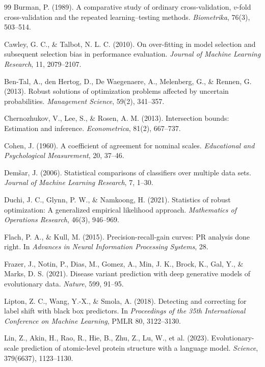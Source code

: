 \documentclass[11pt]{article}
\theoremstyle{remark}
\begin{document}
\begin{thebibliography}{99}
Burman, P. (1989).
A comparative study of ordinary cross-validation, $v$-fold cross-validation
and the repeated learning--testing methods.
\emph{Biometrika}, 76(3), 503--514.

Cawley, G. C., \& Talbot, N. L. C. (2010).
On over-fitting in model selection and subsequent selection bias in performance
evaluation.
\emph{Journal of Machine Learning Research}, 11, 2079--2107.

Ben-Tal, A., den Hertog, D., De Waegenaere, A., Melenberg, G., \& Rennen, G. (2013).
Robust solutions of optimization problems affected by uncertain probabilities.
\emph{Management Science}, 59(2), 341--357.

Chernozhukov, V., Lee, S., \& Rosen, A. M. (2013).
Intersection bounds: Estimation and inference.
\emph{Econometrica}, 81(2), 667--737.

Cohen, J. (1960).
A coefficient of agreement for nominal scales.
\emph{Educational and Psychological Measurement}, 20, 37--46.

Dem\v{s}ar, J. (2006).
Statistical comparisons of classifiers over multiple data sets.
\emph{Journal of Machine Learning Research}, 7, 1--30.

Duchi, J. C., Glynn, P. W., \& Namkoong, H. (2021).
Statistics of robust optimization: A generalized empirical likelihood approach.
\emph{Mathematics of Operations Research}, 46(3), 946--969.

Flach, P. A., \& Kull, M. (2015).
Precision-recall-gain curves: PR analysis done right.
In \emph{Advances in Neural Information Processing Systems}, 28.

Frazer, J., Notin, P., Dias, M., Gomez, A., Min, J. K., Brock, K., Gal, Y., \& Marks, D. S. (2021).
Disease variant prediction with deep generative models of evolutionary data.
\emph{Nature}, 599, 91--95.

Lipton, Z. C., Wang, Y.-X., \& Smola, A. (2018).
Detecting and correcting for label shift with black box predictors.
In \emph{Proceedings of the 35th International Conference on Machine Learning}, PMLR 80, 3122--3130.

Lin, Z., Akin, H., Rao, R., Hie, B., Zhu, Z., Lu, W., et al. (2023).
Evolutionary-scale prediction of atomic-level protein structure with a language model.
\emph{Science}, 379(6637), 1123--1130.


\end{thebibliography}
\end{document}
